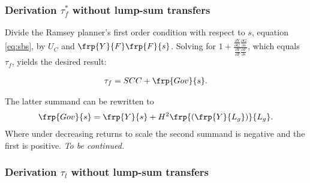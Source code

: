\subsubsection{Derivation $\tau_f^*$ without lump-sum transfers}
	
Divide the Ramsey planner's first order condition with respect to $s$, equation \ref{eq:sbs}, by $U_C$ and $\frp{Y}{F}\frp{F}{s}$. Solving for $1+\frac{\frac{\partial Y}{\partial G}\frac{\partial G}{\partial s}}{\frac{\partial Y}{\partial F}\frac{\partial F}{\partial s}}$, which equals $\tau_f$, yields the desired result:

\begin{align}
\tau_{f}=SCC + \frp{Gov}{s}.
\end{align}

The latter summand can be rewritten to 
\begin{align}
\frp{Gov}{s}= \frp{Y}{s}+H^2 \frp{\left(\frp{Y}{L_g}\right)}{L_g}.
\end{align}
Where under decreasing returns to scale the second summand is negative and the first is positive. \textit{To be continued.} 
\subsubsection{Derivation $\tau_l$ without lump-sum transfers }\label{app:subsub_nltaul}

